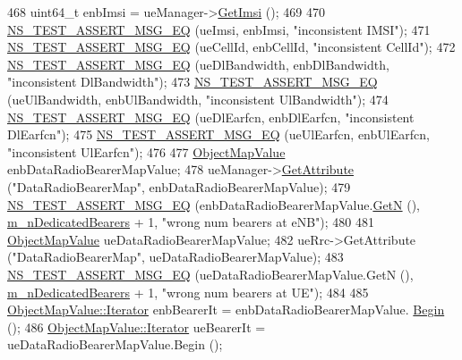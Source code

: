 \begin{DoxyCode}
468   uint64\_t enbImsi = ueManager->\hyperlink{classns3_1_1UeManager_a9609913bb407b13da17a55d9013e8e10}{GetImsi} ();
469 
470   \hyperlink{group__testing_ga2a9d78cffb3db8e867c35fff0b698cf5}{NS\_TEST\_ASSERT\_MSG\_EQ} (ueImsi, enbImsi, \textcolor{stringliteral}{"inconsistent IMSI"});
471   \hyperlink{group__testing_ga2a9d78cffb3db8e867c35fff0b698cf5}{NS\_TEST\_ASSERT\_MSG\_EQ} (ueCellId, enbCellId, \textcolor{stringliteral}{"inconsistent CellId"});
472   \hyperlink{group__testing_ga2a9d78cffb3db8e867c35fff0b698cf5}{NS\_TEST\_ASSERT\_MSG\_EQ} (ueDlBandwidth, enbDlBandwidth, \textcolor{stringliteral}{"inconsistent DlBandwidth"});
473   \hyperlink{group__testing_ga2a9d78cffb3db8e867c35fff0b698cf5}{NS\_TEST\_ASSERT\_MSG\_EQ} (ueUlBandwidth, enbUlBandwidth, \textcolor{stringliteral}{"inconsistent UlBandwidth"});
474   \hyperlink{group__testing_ga2a9d78cffb3db8e867c35fff0b698cf5}{NS\_TEST\_ASSERT\_MSG\_EQ} (ueDlEarfcn, enbDlEarfcn, \textcolor{stringliteral}{"inconsistent DlEarfcn"});
475   \hyperlink{group__testing_ga2a9d78cffb3db8e867c35fff0b698cf5}{NS\_TEST\_ASSERT\_MSG\_EQ} (ueUlEarfcn, enbUlEarfcn, \textcolor{stringliteral}{"inconsistent UlEarfcn"});
476 
477   \hyperlink{classns3_1_1ObjectPtrContainerValue}{ObjectMapValue} enbDataRadioBearerMapValue;
478   ueManager->\hyperlink{classns3_1_1ObjectBase_a895d1de2f96063d0e0fd78463e7a7e30}{GetAttribute} (\textcolor{stringliteral}{"DataRadioBearerMap"}, enbDataRadioBearerMapValue);
479   \hyperlink{group__testing_ga2a9d78cffb3db8e867c35fff0b698cf5}{NS\_TEST\_ASSERT\_MSG\_EQ} (enbDataRadioBearerMapValue.\hyperlink{classns3_1_1ObjectPtrContainerValue_a0b282241030189e3f60e76e52d176710}{GetN} (), 
      \hyperlink{classLteX2HandoverTestCase_af2146e1a8c7985f642c7fb69ad7ec345}{m\_nDedicatedBearers} + 1, \textcolor{stringliteral}{"wrong num bearers at eNB"});  
480 
481   \hyperlink{classns3_1_1ObjectPtrContainerValue}{ObjectMapValue} ueDataRadioBearerMapValue;
482   ueRrc->GetAttribute (\textcolor{stringliteral}{"DataRadioBearerMap"}, ueDataRadioBearerMapValue);
483   \hyperlink{group__testing_ga2a9d78cffb3db8e867c35fff0b698cf5}{NS\_TEST\_ASSERT\_MSG\_EQ} (ueDataRadioBearerMapValue.GetN (), 
      \hyperlink{classLteX2HandoverTestCase_af2146e1a8c7985f642c7fb69ad7ec345}{m\_nDedicatedBearers} + 1, \textcolor{stringliteral}{"wrong num bearers at UE"}); 
484 
485   \hyperlink{classns3_1_1ObjectPtrContainerValue_a1f0661f9cf3626d62a4623f36b672876}{ObjectMapValue::Iterator} enbBearerIt = enbDataRadioBearerMapValue.
      \hyperlink{classns3_1_1ObjectPtrContainerValue_a2dd05c2e7483eb2eeeb0b2389f238815}{Begin} ();
486   \hyperlink{classns3_1_1ObjectPtrContainerValue_a1f0661f9cf3626d62a4623f36b672876}{ObjectMapValue::Iterator} ueBearerIt = ueDataRadioBearerMapValue.Begin ();

\end{DoxyCode}
